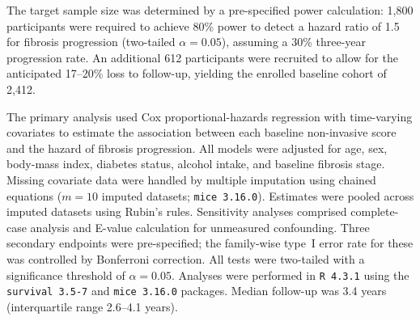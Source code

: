 \documentclass[11pt,a4paper]{article}
\newcommand{\Rsoftware}{\texttt{R~4.3.1}\xspace}
\newcommand{\survpkg}{\texttt{survival~3.5-7}\xspace}
\newcommand{\micepkg}{\texttt{mice~3.16.0}\xspace}
\begin{document}
The target sample size was determined by a pre-specified power calculation: 1{,}800
participants were required to achieve 80\% power to detect a hazard ratio of 1.5 for
fibrosis progression (two-tailed $\alpha = 0.05$), assuming a 30\% three-year progression
rate. An additional 612 participants were recruited to allow for the anticipated 17--20\%
loss to follow-up, yielding the enrolled baseline cohort of 2{,}412.

The primary analysis used Cox proportional-hazards regression with time-varying covariates
to estimate the association between each baseline non-invasive score and the hazard of
fibrosis progression. All models were adjusted for age, sex, body-mass index, diabetes
status, alcohol intake, and baseline fibrosis stage. Missing covariate data were handled by
multiple imputation using chained equations ($m = 10$ imputed datasets; \micepkg). Estimates
were pooled across imputed datasets using Rubin's rules. Sensitivity analyses comprised
complete-case analysis and E-value calculation for unmeasured confounding. Three secondary
endpoints were pre-specified; the family-wise type~I error rate for these was controlled by
Bonferroni correction. All tests were two-tailed with a significance threshold of
$\alpha = 0.05$. Analyses were performed in \Rsoftware using the \survpkg and \micepkg
packages. Median follow-up was 3.4 years (interquartile range 2.6--4.1 years).
\end{document}
